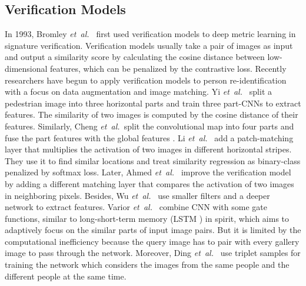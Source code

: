 \documentclass[journal]{IEEEtran}
\newcommand{\etal}{\mbox{\emph{et al.\ }}}
\begin{document}
\subsection{Verification Models}
In 1993, Bromley \etal \cite{bromley1993signature} first used verification models to deep metric learning in signature verification. Verification models usually take a pair of images as input and output a similarity score by calculating the cosine distance between low-dimensional features, which can be penalized by the contrastive loss. Recently researchers have begun to apply verification models to person re-identification with a focus on data augmentation and image matching. 
Yi \etal \cite{yi2014deep} split a pedestrian image into three horizontal parts and train three part-CNNs to extract features. The similarity of two images is computed by the cosine distance of their features. Similarly, Cheng \etal split the convolutional map into four parts and fuse the part features with the global features \cite{cheng2016person}.
Li \etal \cite{li2014deepreid} add a patch-matching layer that multiplies the activation of two images in different horizontal stripes. They use it to find similar locations and treat similarity regression as binary-class  penalized by softmax loss. 
Later, Ahmed \etal \cite{ahmed2015improved} improve the verification model by adding a different matching layer that compares the activation of two images in neighboring pixels.
Besides, Wu \etal \cite{wu2016personnet} use smaller filters and a deeper network to extract features. 
Varior \etal \cite{varior2016gated} combine CNN with some gate functions, similar to long-short-term memory (LSTM \cite{hochreiter1997long}) in spirit, which aims to adaptively focus on the similar parts of input image pairs. But it is limited by the computational inefficiency because the query image has to pair with every gallery image to pass through the network. Moreover, Ding \etal \cite{ding2015deep} use triplet samples for training the network which considers the images from the same people and the different people at the same time. 
\end{document}
